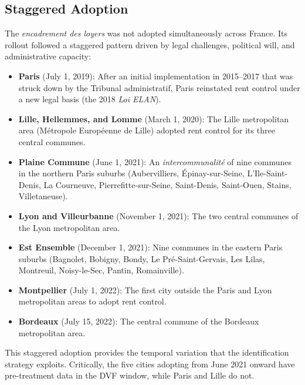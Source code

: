 \documentclass[12pt]{article}
\begin{document}
\subsection{Staggered Adoption}

The \emph{encadrement des loyers} was not adopted simultaneously across France. Its rollout followed a staggered pattern driven by legal challenges, political will, and administrative capacity:

\begin{itemize}
\item \textbf{Paris} (July 1, 2019): After an initial implementation in 2015--2017 that was struck down by the Tribunal administratif, Paris reinstated rent control under a new legal basis (the 2018 \emph{Loi ELAN}).

\item \textbf{Lille, Hellemmes, and Lomme} (March 1, 2020): The Lille metropolitan area (M\'etropole Europ\'eenne de Lille) adopted rent control for its three central communes.

\item \textbf{Plaine Commune} (June 1, 2021): An \emph{intercommunalit\'e} of nine communes in the northern Paris suburbs (Aubervilliers, \'Epinay-sur-Seine, L'Ile-Saint-Denis, La Courneuve, Pierrefitte-sur-Seine, Saint-Denis, Saint-Ouen, Stains, Villetaneuse).

\item \textbf{Lyon and Villeurbanne} (November 1, 2021): The two central communes of the Lyon metropolitan area.

\item \textbf{Est Ensemble} (December 1, 2021): Nine communes in the eastern Paris suburbs (Bagnolet, Bobigny, Bondy, Le Pr\'e-Saint-Gervais, Les Lilas, Montreuil, Noisy-le-Sec, Pantin, Romainville).

\item \textbf{Montpellier} (July 1, 2022): The first city outside the Paris and Lyon metropolitan areas to adopt rent control.

\item \textbf{Bordeaux} (July 15, 2022): The central commune of the Bordeaux metropolitan area.
\end{itemize}

This staggered adoption provides the temporal variation that the identification strategy exploits. Critically, the five cities adopting from June 2021 onward have pre-treatment data in the DVF window, while Paris and Lille do not.
\end{document}
